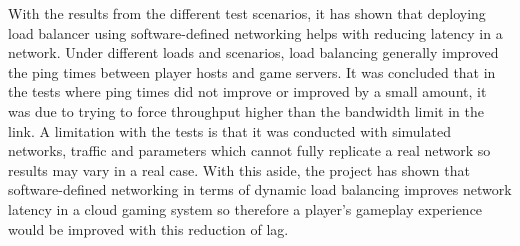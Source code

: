 \newline
\par
With the results from the different test scenarios, it has shown that deploying load balancer using software-defined networking helps with reducing latency in a network. Under different loads and scenarios, load balancing generally improved the ping times between player hosts and game servers. It was concluded that in the tests where ping times did not improve or improved by a small amount, it was due to trying to force throughput higher than the bandwidth limit in the link. A limitation with the tests is that it was conducted with simulated networks, traffic and parameters which cannot fully replicate a real network so results may vary in a real case. With this aside, the project has shown that software-defined networking in terms of dynamic load balancing improves network latency in a cloud gaming system so therefore a player's gameplay experience would be improved with this reduction of lag.

